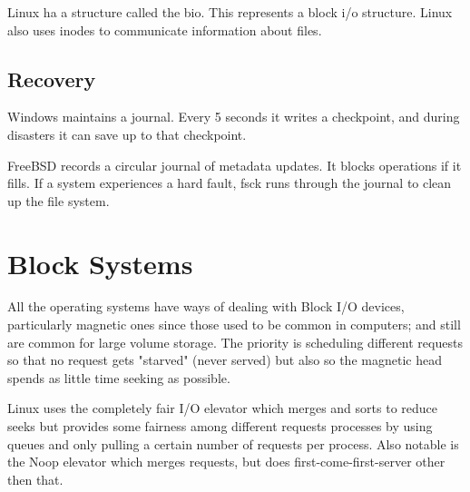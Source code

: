 \documentclass[draftclsnofoot,onecolumn]{IEEEtran}
\begin{document}
Linux ha a structure called the bio. This represents a block i/o structure. Linux also uses inodes to communicate information about files.

\subsection{Recovery}

Windows maintains a journal. Every 5 seconds it writes a checkpoint, and during disasters it can save up to that checkpoint.

FreeBSD records a circular journal of metadata updates. It blocks operations if it fills. If a system experiences a hard fault, fsck runs through the journal to clean up the file system.

\section{Block Systems}

All the operating systems have ways of dealing with Block I/O devices, particularly magnetic ones since those used to be common in computers; and still are common for large volume storage. The priority is scheduling different requests so that no request gets "starved" (never served) but also so the magnetic head spends as little time seeking as possible.

Linux uses the completely fair I/O elevator which merges and sorts to reduce seeks but provides some fairness among different requests processes by using queues and only pulling a certain number of requests per process. Also notable is the Noop elevator which merges requests, but does first-come-first-server other then that.
\end{document}
